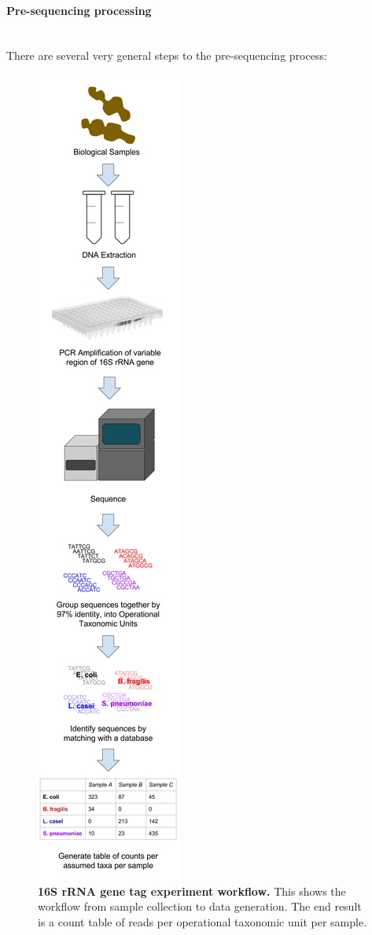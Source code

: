 \paragraph{Pre-sequencing processing}\mbox{}\\
There are several very general steps to the pre-sequencing process:

\begin{figure}[h]
\begin{center}
\includegraphics[height=0.8\textheight]{16S_rRNA_pipeline.png}
\caption[16S rRNA gene tag experiment workflow.]{\textbf{16S rRNA gene tag experiment workflow.} This shows the workflow from sample collection to data generation. The end result is a count table of reads per operational taxonomic unit per sample.}
\end{center}
\label{16s_workflow}
\end{figure}

